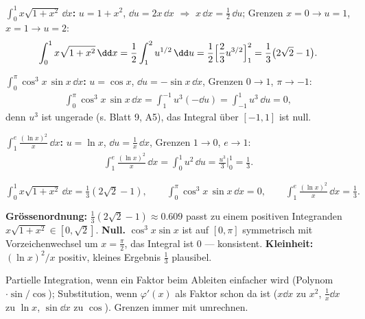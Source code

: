 \textbf{$\int_0^1 x\sqrt{1+x^2}\,\dd x$:} $u=1+x^2$, $\dd u=2x\,\dd x$
$\Rightarrow$ $x\,\dd x=\frac12\,\dd u$; Grenzen
$x{=}0{\to}u{=}1$, $x{=}1{\to}u{=}2$:
\begin{align}
  \int_0^1 x\sqrt{1+x^2}\,\dd x
  = \frac12\int_1^2 u^{1/2}\,\dd u
  = \frac12\Bigl[\frac23 u^{3/2}\Bigr]_1^2
  = \frac13\bigl(2\sqrt2-1\bigr) .
\end{align}

\textbf{$\int_0^\pi \cos^3 x\,\sin x\,\dd x$:} $u=\cos x$, $\dd u=-\sin x\,\dd x$,
Grenzen $0{\to}1$, $\pi{\to}{-}1$:
\begin{align}
  \int_0^\pi \cos^3 x\,\sin x\,\dd x
  = \int_{1}^{-1} u^3(-\dd u)
  = \int_{-1}^{1} u^3\,\dd u = 0 ,
\end{align}
denn $u^3$ ist ungerade (s. Blatt 9, A5), das Integral über $[-1,1]$ ist null.

\textbf{$\int_1^e \frac{(\ln x)^2}{x}\,\dd x$:} $u=\ln x$, $\dd u=\frac1x\,\dd x$,
Grenzen $1{\to}0$, $e{\to}1$:
\begin{align}
  \int_1^e \frac{(\ln x)^2}{x}\,\dd x
  = \int_0^1 u^2\,\dd u = \frac{u^3}{3}\Big|_0^1 = \frac13 .
\end{align}

\begin{ergebnis}
$\displaystyle\int_0^1 x\sqrt{1+x^2}\,\dd x=\frac13(2\sqrt2-1),\qquad
\int_0^\pi \cos^3 x\,\sin x\,\dd x=0,\qquad
\int_1^e\frac{(\ln x)^2}{x}\,\dd x=\frac13.$
\end{ergebnis}

\begin{kontrolle}
\textbf{Grössenordnung:} $\frac13(2\sqrt2-1)\approx0.609$ passt zu einem
positiven Integranden $x\sqrt{1+x^2}\in[0,\sqrt2]$. \textbf{Null.} $\cos^3x\sin x$ ist auf $[0,\pi]$
symmetrisch mit Vorzeichenwechsel um $x=\frac\pi2$, das Integral ist $0$ —
konsistent. \textbf{Kleinheit:} $(\ln x)^2/x$ positiv, kleines Ergebnis
$\frac13$ plausibel.
\end{kontrolle}

\begin{merksatz}
Partielle Integration, wenn ein Faktor beim Ableiten einfacher wird
(Polynom$\cdot\sin/\cos$); Substitution, wenn $\varphi'(x)$ als Faktor schon
da ist ($x\dd x$ zu $x^2$, $\frac1x\dd x$ zu $\ln x$, $\sin\dd x$ zu $\cos$).
Grenzen immer mit umrechnen.
\end{merksatz}
